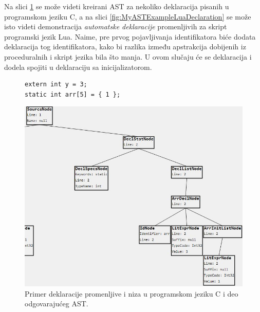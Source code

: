 Na slici \ref{fig:MyASTExampleCDeclaration} se može videti kreirani AST za nekoliko deklaracija pisanih u programskom jeziku C, a na slici \ref{fig:MyASTExampleLuaDeclaration} se može isto videti demonstracija \emph{automatske deklaracije} promenljivih za skript programski jezik Lua. Naime, pre prvog pojavljivanja identifikatora biće dodata deklaracija tog identifikatora, kako bi razlika između apstrakcija dobijenih iz proceduralnih i skript jezika bila što manja. U ovom slučaju će se deklaracija i dodela spojiti u deklaraciju sa inicijalizatorom.

\begin{figure}[h!]
\begin{lstlisting}
extern int y = 3;
static int arr[5] = { 1 };
\end{lstlisting}
\centering
\includegraphics[scale=0.7]{images/c_ast_decl2_cropped.png}
\caption{Primer deklaracije promenljive i niza u programskom jeziku C i deo odgovarajućeg AST.}
\label{fig:MyASTExampleCDeclaration}
\end{figure}

